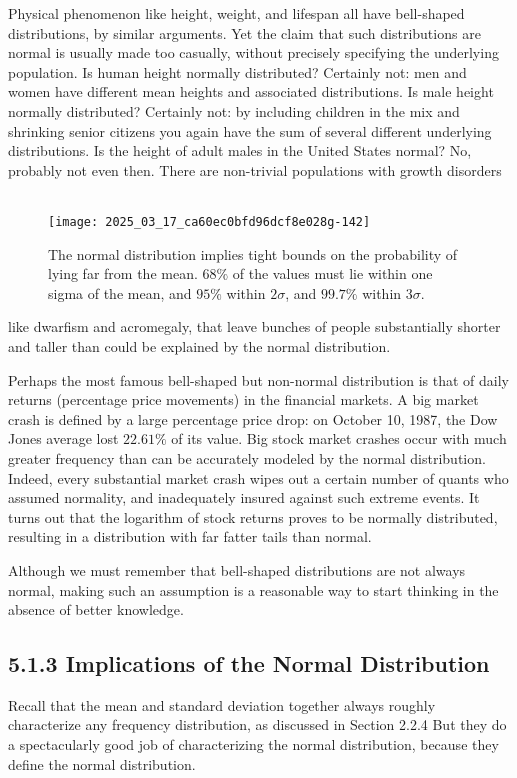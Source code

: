\documentclass[10pt]{article}
\begin{document}
Physical phenomenon like height, weight, and lifespan all have bell-shaped distributions, by similar arguments. Yet the claim that such distributions are normal is usually made too casually, without precisely specifying the underlying population. Is human height normally distributed? Certainly not: men and women have different mean heights and associated distributions. Is male height normally distributed? Certainly not: by including children in the mix and shrinking senior citizens you again have the sum of several different underlying distributions. Is the height of adult males in the United States normal? No, probably not even then. There are non-trivial populations with growth disorders\
\
\begin{figure}[h]
\centering
\texttt{[image: 2025\_03\_17\_ca60ec0bfd96dcf8e028g-142]}
\caption{The normal distribution implies tight bounds on the probability of lying far from the mean. $68 \%$ of the values must lie within one sigma of the mean, and $95 \%$ within $2 \sigma$, and $99.7 \%$ within $3 \sigma$.} 
\end{figure}

like dwarfism and acromegaly, that leave bunches of people substantially shorter and taller than could be explained by the normal distribution.

Perhaps the most famous bell-shaped but non-normal distribution is that of daily returns (percentage price movements) in the financial markets. A big market crash is defined by a large percentage price drop: on October 10, 1987, the Dow Jones average lost $22.61 \%$ of its value. Big stock market crashes occur with much greater frequency than can be accurately modeled by the normal distribution. Indeed, every substantial market crash wipes out a certain number of quants who assumed normality, and inadequately insured against such extreme events. It turns out that the logarithm of stock returns proves to be normally distributed, resulting in a distribution with far fatter tails than normal.

Although we must remember that bell-shaped distributions are not always normal, making such an assumption is a reasonable way to start thinking in the absence of better knowledge.

\subsection*{5.1.3 Implications of the Normal Distribution}
Recall that the mean and standard deviation together always roughly characterize any frequency distribution, as discussed in Section 2.2.4 But they do a spectacularly good job of characterizing the normal distribution, because they define the normal distribution.
\end{document}
